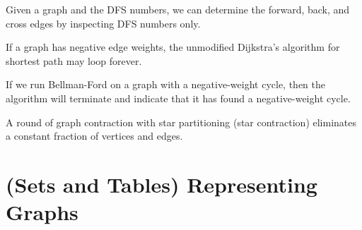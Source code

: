 \begin{problem}
\asktf 
Given a graph and the DFS numbers, we can determine the
forward, back, and cross edges by inspecting DFS numbers only.  
\solt

\asktf

If a graph has negative edge weights, the unmodified Dijkstra's
algorithm for shortest path may loop forever.

\solf

\asktf

If we run Bellman-Ford on a graph with a negative-weight cycle, then
the algorithm will terminate and indicate that it has found a
negative-weight cycle.

\solf


\asktf 

A round of graph contraction with star partitioning (star contraction)
eliminates a constant fraction of vertices and edges.

\solf


\end{problem}

\section{(Sets and Tables) Representing Graphs}


